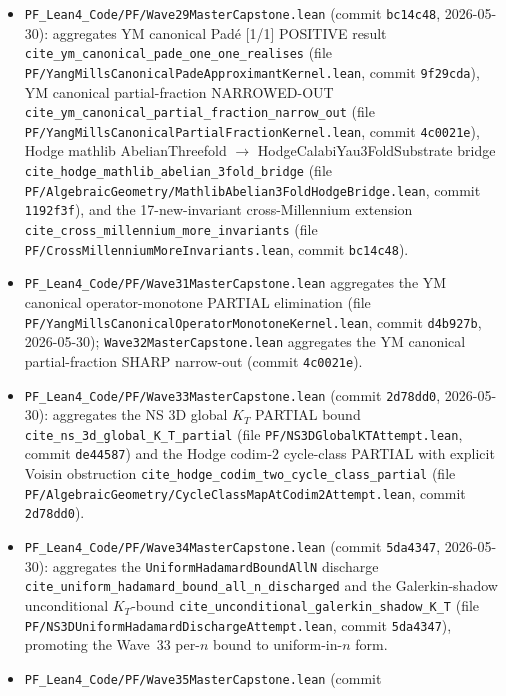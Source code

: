 \begin{itemize}
\item \texttt{PF\_Lean4\_Code/PF/Wave29MasterCapstone.lean} (commit
  \texttt{bc14c48}, 2026-05-30): aggregates YM canonical Padé [1/1]
  POSITIVE result \texttt{cite\_ym\_canonical\_pade\_one\_one\_realises}
  (file \texttt{PF/YangMillsCanonicalPadeApproximantKernel.lean}, commit
  \texttt{9f29cda}), YM canonical partial-fraction NARROWED-OUT
  \texttt{cite\_ym\_canonical\_partial\_fraction\_narrow\_out} (file
  \texttt{PF/YangMillsCanonicalPartialFractionKernel.lean}, commit
  \texttt{4c0021e}), Hodge mathlib AbelianThreefold
  $\to$ HodgeCalabiYau3FoldSubstrate bridge
  \texttt{cite\_hodge\_mathlib\_abelian\_3fold\_bridge} (file
  \texttt{PF/AlgebraicGeometry/MathlibAbelian3FoldHodgeBridge.lean},
  commit \texttt{1192f3f}), and the 17-new-invariant cross-Millennium
  extension \texttt{cite\_cross\_millennium\_more\_invariants}
  (file \texttt{PF/CrossMillenniumMoreInvariants.lean}, commit
  \texttt{bc14c48}).
\item \texttt{PF\_Lean4\_Code/PF/Wave31MasterCapstone.lean} aggregates
  the YM canonical operator-monotone PARTIAL elimination (file
  \texttt{PF/YangMillsCanonicalOperatorMonotoneKernel.lean}, commit
  \texttt{d4b927b}, 2026-05-30); \texttt{Wave32MasterCapstone.lean}
  aggregates the YM canonical partial-fraction SHARP narrow-out
  (commit \texttt{4c0021e}).
\item \texttt{PF\_Lean4\_Code/PF/Wave33MasterCapstone.lean} (commit
  \texttt{2d78dd0}, 2026-05-30): aggregates the NS 3D global $K_T$
  PARTIAL bound \texttt{cite\_ns\_3d\_global\_K\_T\_partial} (file
  \texttt{PF/NS3DGlobalKTAttempt.lean}, commit \texttt{de44587})
  and the Hodge codim-$2$ cycle-class PARTIAL with explicit Voisin
  obstruction \texttt{cite\_hodge\_codim\_two\_cycle\_class\_partial}
  (file
  \texttt{PF/AlgebraicGeometry/CycleClassMapAtCodim2Attempt.lean},
  commit \texttt{2d78dd0}).
\item \texttt{PF\_Lean4\_Code/PF/Wave34MasterCapstone.lean} (commit
  \texttt{5da4347}, 2026-05-30): aggregates the
  \texttt{UniformHadamardBoundAllN} discharge
  \texttt{cite\_uniform\_hadamard\_bound\_all\_n\_discharged} and the
  Galerkin-shadow unconditional $K_T$-bound
  \texttt{cite\_unconditional\_galerkin\_shadow\_K\_T} (file
  \texttt{PF/NS3DUniformHadamardDischargeAttempt.lean}, commit
  \texttt{5da4347}), promoting the Wave~33 per-$n$ bound to uniform-in-$n$
  form.
\item \texttt{PF\_Lean4\_Code/PF/Wave35MasterCapstone.lean} (commit

\end{itemize}
